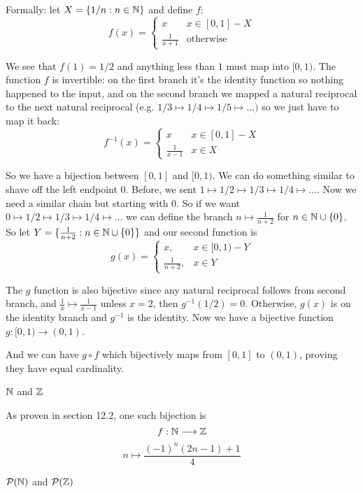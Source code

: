 \documentclass{article}
\begin{document}
Formally: let $X = \{1/n: n \in \mathbb{N}\}$ and define $f$:
$$f(x) = \begin{cases}
    x             & x \in [0, 1] - X \\
    \frac{1}{x+1} & \text{otherwise}
  \end{cases}
$$

We see that $f(1) = 1/2$ and anything less than $1$ must map into $[0, 1)$. The function $f$ is invertible: on the first branch it's the identity function so nothing happened to the input, and on the second branch we mapped a natural reciprocal to the next natural reciprocal (e.g. $1/3 \mapsto 1/4 \mapsto 1/5 \mapsto \ldots)$ so we just have to map it back:
$$f^{-1}(x) = \begin{cases}
    x               & x \in [0, 1] - X \\
    \frac{1}{x - 1} & x \in X
  \end{cases}
$$

So we have a bijection between $[0, 1]$ and $[0, 1)$. We can do something similar to shave off the left endpoint 0. Before, we sent $1 \mapsto 1/2 \mapsto 1/3 \mapsto 1/4 \mapsto \ldots$. Now we need a similar chain but starting with 0. So if we want $0 \mapsto 1/2 \mapsto 1/3 \mapsto 1/4 \mapsto \ldots$ we can define the branch $n \mapsto \frac{1}{n + 2}$ for $n \in \mathbb{N} \cup \{0\}$. So let $Y = \{\frac{1}{n+2}: n \in \mathbb{N} \cup \{0\}\}$ and our second function is
$$g(x) = \begin{cases}
    x ,              & x \in [0, 1) - Y \\
    \frac{1}{n + 2}, & x \in Y
  \end{cases}$$

The $g$ function is also bijective since any natural reciprocal follows from second branch, and $\frac{1}{x} \mapsto \frac{1}{x - 1}$ unless $x = 2$, then $g^{-1}(1/2) = 0$. Otherwise, $g(x)$ is on the identity branch and $g^{-1}$ is the identity. Now we have a bijective function $g: [0, 1) \to (0, 1)$.

And we can have $g \circ f$ which bijectively maps from $[0, 1]$ to $(0, 1)$, proving they have equal cardinality.

\begin{problem}
$\mathbb{N}$ and $\mathbb{Z}$
\end{problem}

As proven in section 12.2, one such bijection is
$$f: \mathbb{N} \longrightarrow \mathbb{Z}$$
$$n \longmapsto \frac{(-1)^n(2n - 1) + 1}{4}$$

\begin{problem}
$\mathcal{P}(\mathbb{N})$ and $\mathcal{P}(\mathbb{Z})$
\end{problem}
\end{document}
